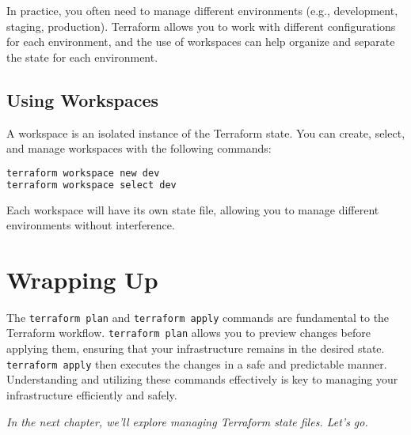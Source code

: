 In practice, you often need to manage different environments (e.g., development, staging, production). Terraform allows you to work with different configurations for each environment, and the use of workspaces can help organize and separate the state for each environment.

\subsection{Using Workspaces}

A workspace is an isolated instance of the Terraform state. You can create, select, and manage workspaces with the following commands:

\begin{lstlisting}[language=bash]
terraform workspace new dev
terraform workspace select dev
\end{lstlisting}

Each workspace will have its own state file, allowing you to manage different environments without interference.

\section{Wrapping Up}

The \texttt{terraform plan} and \texttt{terraform apply} commands are fundamental to the Terraform workflow. \texttt{terraform plan} allows you to preview changes before applying them, ensuring that your infrastructure remains in the desired state. \texttt{terraform apply} then executes the changes in a safe and predictable manner. Understanding and utilizing these commands effectively is key to managing your infrastructure efficiently and safely.

\vspace{1em}

\textit{In the next chapter, we'll explore managing Terraform state files. Let's go.}
